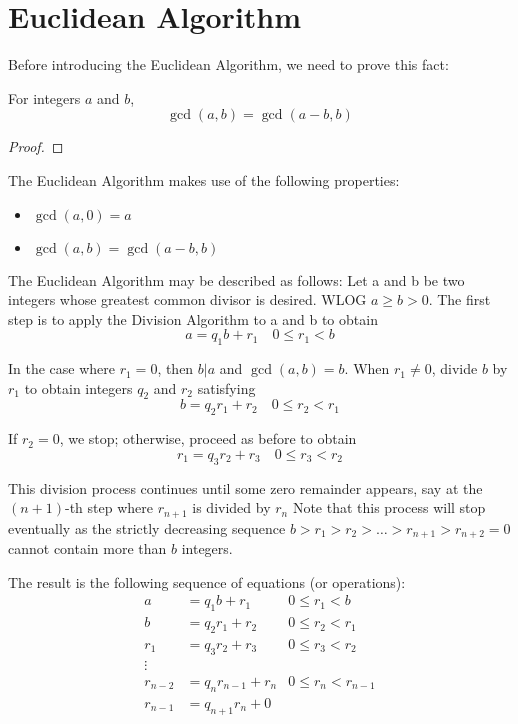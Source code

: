 \section{Euclidean Algorithm}
Before introducing the Euclidean Algorithm, we need to prove this fact:
\begin{proposition}
For integers $a$ and $b$, 
\[ \gcd(a,b) = \gcd(a-b,b) \]
\end{proposition}
\begin{proof}

\end{proof}

The Euclidean Algorithm makes use of the following properties:
\begin{itemize}
\item $\gcd(a,0) = a$
\item $\gcd(a,b) = \gcd(a-b,b)$
\end{itemize}

The Euclidean Algorithm may be described as follows: Let a and b be two integers whose greatest common divisor is desired. WLOG $a \ge b > 0$. 
The first step is to apply the Division Algorithm to a and b to obtain
\[ a = q_1b + r_1 \quad 0 \le r_1 < b \]

In the case where $r_1 = 0$, then $b | a$ and $\gcd(a, b) = b$. When $r_1 \neq 0$, divide $b$ by $r_1$ to obtain integers $q_2$ and $r_2$ satisfying
\[ b = q_2r_1 + r_2 \quad 0 \le r_2 < r_1 \]

If $r_2 = 0$, we stop; otherwise, proceed as before to obtain
\[ r_1 = q_3r_2 + r_3 \quad 0 \le r_3 < r_2 \]

This division process continues until some zero remainder appears, say at the $(n+1)$-th step where $r_{n+1}$ is divided by $r_n$ Note that this process will stop eventually as the strictly decreasing sequence $b > r_1 > r_2 > \dots > r_{n+1} > r_{n+2} = 0$ cannot contain more than $b$ integers.

The result is the following sequence of equations (or operations):
\begin{align*}
a &= q_1b + r_1 & 0 \le r_1 < b \\
b &= q_2r_1 + r_2 & 0 \le r_2 < r_1 \\
r_1 &= q_3r_2 + r_3 & 0 \le r_3 < r_2 \\
\vdots \\
r_{n-2} &= q_nr_{n-1} + r_n & 0 \le r_n < r_{n-1} \\
r_{n-1} &= q_{n+1} r_n + 0
\end{align*}

